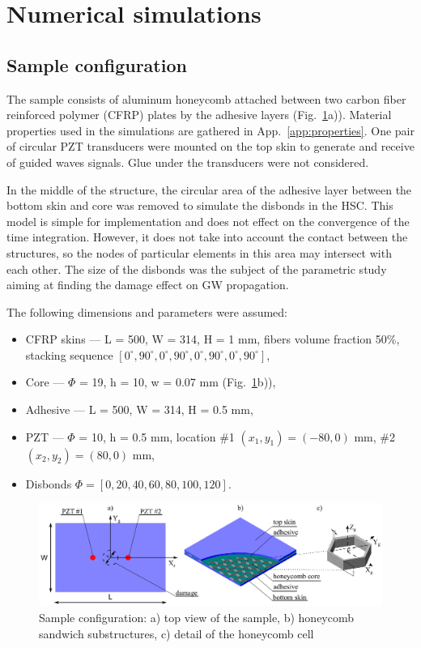 \documentclass[a4paper,12pt]{article}
\begin{document}
{\section{Numerical simulations}
\label{sec:numerical}
\subsection{Sample configuration}
\label{sec:sample}
The sample consists of aluminum honeycomb attached between two carbon fiber 
reinforced polymer (CFRP) plates by the adhesive layers 
(Fig.~\ref{fig:honeycomb}a)).
Material properties used in the simulations are gathered in 
App.~\ref{app:properties}.
One pair of circular PZT transducers were mounted on the top skin to generate 
and receive of guided waves signals.
Glue under the transducers were not considered.

In the middle of the structure, the circular area of the adhesive layer between 
the bottom skin and core was removed to simulate the disbonds in the HSC.
This model is simple for implementation and does not effect on the convergence of the time integration.
However, it does not take into account the contact between the structures, so the nodes of particular elements in this area may intersect with each other.
The size of the disbonds was the subject of the parametric study aiming at 
finding the damage effect on GW propagation.

The following dimensions and parameters were assumed:
\begin{itemize}
	\item CFRP skins --- L = 500, W = 314, H = 1 mm, fibers volume fraction 
	50\%, stacking sequence 
	\([0^\circ,90^\circ,0^\circ,90^\circ,0^\circ,90^\circ,0^\circ,90^\circ]\),
	\item Core --- \(\Phi\) = 19, h = 10, w = 0.07 mm 
	(Fig.~\ref{fig:honeycomb}b)),
	\item Adhesive --- L = 500, W = 314, H = 0.5 mm,
	\item PZT --- \(\Phi\) = 10, h = 0.5 mm, location \#1 \((x_1,y_1)=(-80,0)\) 
	mm,	\#2 \((x_2,y_2)=(80,0)\) mm,
	\item Disbonds \(\Phi = \left [0, 20, 40, 60, 80, 100, 120 \right ]\).
\end{itemize}

\begin{figure}
	\begin{center}
		\includegraphics[width=1\linewidth]{../../../figures/eps/honeycomb.eps}
	\end{center}
	\caption{Sample configuration: a) top view of the sample, b) honeycomb sandwich substructures, c) detail of the honeycomb cell}
	\label{fig:honeycomb}
\end{figure}

}
\end{document}
